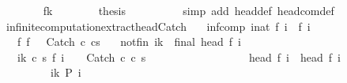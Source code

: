 \begin{isabellebody}
\ \ \ \ \ \ \isamarkupfalse%
\ f{\isacharunderscore}k\isanewline
\ \ \ \ \ \ \isamarkupfalse%
\ {\isacharquery}thesis\isanewline
\ \ \ \ \ \ \ \ \isamarkupfalse%
\ {\isacharparenleft}simp\ add{\isacharcolon}\ head{\isacharunderscore}def\ head{\isacharunderscore}com{\isacharunderscore}def{\isacharparenright}\isanewline
\ \ \ \ \isamarkupfalse%
\isanewline
\ \ \isamarkupfalse%
\isanewline
{}\isamarkupfalse%
%
\endisatagproof
{\isafoldproof}%
%
\isadelimproof
\isanewline
%
\endisadelimproof
\isanewline
{}\isamarkupfalse%
\ infinite{\isacharunderscore}computation{\isacharunderscore}extract{\isacharunderscore}head{\isacharunderscore}Catch{\isacharcolon}\isanewline
\ \ \ inf{\isacharunderscore}comp{\isacharcolon}\ {\isachardoublequoteopen}{\isasymforall}i{\isacharcolon}{\isacharcolon}nat{\isachardot}\ {\isasymGamma}{\isasymturnstile}f\ i\ {\isasymrightarrow}\ f\ {\isacharparenleft}i{\isacharplus}{}{\isacharparenright}{\isachardoublequoteclose}\isanewline
\ \ \ f{\isacharunderscore}{}{\isacharcolon}\ {\isachardoublequoteopen}f\ {}\ {\isacharequal}\ {\isacharparenleft}Catch\ c\ cs{\isacharparenright}{\isachardoublequoteclose}\isanewline
\ \ \ not{\isacharunderscore}fin{\isacharcolon}\ {\isachardoublequoteopen}{\isasymforall}i{\isacharless}k{\isachardot}\ {\isasymnot}\ final\ {\isacharparenleft}head\ {\isacharparenleft}f\ i{\isacharparenright}{\isacharparenright}{\isachardoublequoteclose}\isanewline
\ \ \ {\isachardoublequoteopen}{\isasymforall}i{\isacharless}k{\isachardot}\ {\isacharparenleft}{\isasymexists}c{\isacharprime}\ s{\isacharprime}{\isachardot}\ f\ {\isacharparenleft}i\ {\isacharplus}\ {}{\isacharparenright}\ {\isacharequal}\ {\isacharparenleft}Catch\ c{\isacharprime}\ c\ s{\isacharprime}{\isacharparenright}{\isacharparenright}\ {\isasymand}\ \ \isanewline
\ \ \ \ \ \ \ \ \ \ \ \ \ \ \ {\isasymGamma}{\isasymturnstile}head\ {\isacharparenleft}f\ i{\isacharparenright}\ {\isasymrightarrow}\ head\ {\isacharparenleft}f\ {\isacharparenleft}i{\isacharplus}{}{\isacharparenright}{\isacharparenright}{\isachardoublequoteclose}\isanewline
\ \ \ \ \ \ \ \ {\isacharparenleft}\ {\isachardoublequoteopen}{\isasymforall}i{\isacharless}k{\isachardot}\ {\isacharquery}P\ i{\isachardoublequoteclose}{\isacharparenright}\isanewline

\end{isabellebody}
